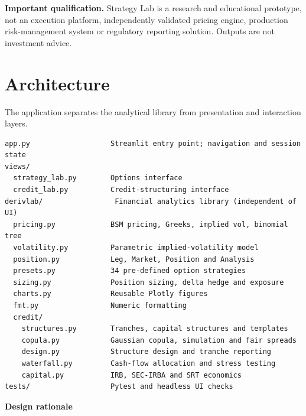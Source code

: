 \documentclass[10pt,a4paper]{article}
\numberwithin{equation}{section}
\begin{document}
\textbf{Important qualification.} Strategy Lab is a research and educational prototype, not an execution platform, independently validated pricing engine, production risk-management system or regulatory reporting solution. Outputs are not investment advice.

\section{Architecture}\label{architecture}

The application separates the analytical library from presentation and interaction layers.

\begin{lstlisting}[style=architecture]
app.py                   Streamlit entry point; navigation and session state
views/
  strategy_lab.py        Options interface
  credit_lab.py          Credit-structuring interface
derivlab/                 Financial analytics library (independent of UI)
  pricing.py             BSM pricing, Greeks, implied vol, binomial tree
  volatility.py          Parametric implied-volatility model
  position.py            Leg, Market, Position and Analysis
  presets.py             34 pre-defined option strategies
  sizing.py              Position sizing, delta hedge and exposure
  charts.py              Reusable Plotly figures
  fmt.py                 Numeric formatting
  credit/
    structures.py        Tranches, capital structures and templates
    copula.py            Gaussian copula, simulation and fair spreads
    design.py            Structure design and tranche reporting
    waterfall.py         Cash-flow allocation and stress testing
    capital.py           IRB, SEC-IRBA and SRT economics
tests/                   Pytest and headless UI checks
\end{lstlisting}

\textbf{Design rationale}
\end{document}
